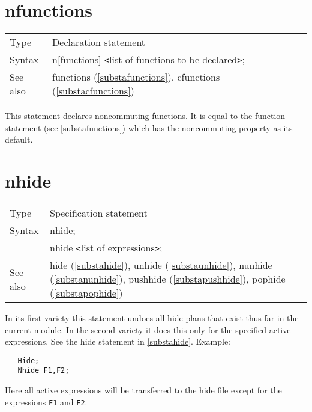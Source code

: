  
\section{nfunctions}
\label{substanfunctions}

\noindent \begin{tabular}{ll}
Type & Declaration statement\\
Syntax & n[functions] {\tt<}list of functions to be declared{\tt>}; \\
See also & functions (\ref{substafunctions}), cfunctions (\ref{substacfunctions})
\end{tabular} \vspace{4mm}

\noindent This statement declares 
noncommuting functions. It is equal to the 
function statement (see \ref{substafunctions}) which has 
the noncommuting property as its default. \vspace{10mm}


\section{nhide}
\label{substanhide}

\noindent \begin{tabular}{ll}
Type & Specification statement\\
Syntax & nhide; \\
       & nhide {\tt<}list of expressions{\tt>};
\\ See also & hide (\ref{substahide}),
              unhide (\ref{substaunhide}),
              nunhide (\ref{substanunhide}),
              pushhide (\ref{substapushhide}),
              pophide (\ref{substapophide})
\end{tabular} \vspace{4mm}

\noindent In its first variety this statement undoes all 
hide plans that exist thus far in the current module. In the 
second variety it does this only for the specified active 
expressions. See the hide statement in \ref{substahide}. Example:
\begin{verbatim}
   Hide;
   Nhide F1,F2;
\end{verbatim}
Here all active expressions will be transferred to the hide file except for 
the expressions \verb:F1: and \verb:F2:. \vspace{10mm}

